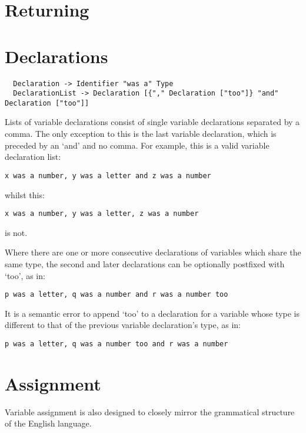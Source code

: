 \documentclass[a4wide, 11pt]{article}
\begin{document}
\section {Returning}

\section{Declarations}

\begin{verbatim}
  Declaration -> Identifier "was a" Type
  DeclarationList -> Declaration [{"," Declaration ["too"]} "and" Declaration ["too"]]
\end{verbatim}

Lists of variable declarations consist of single variable declarations separated by a comma. The only exception to this is the last variable declaration, which is preceded by an `and' and no comma. For example, this is a valid variable declaration list:

\begin{verbatim}
x was a number, y was a letter and z was a number
\end{verbatim}

whilst this:

\begin{verbatim}
x was a number, y was a letter, z was a number
\end{verbatim}

is not.

Where there are one or more consecutive declarations of variables which share the same type, the second and later declarations can be optionally postfixed with `too', as in:

\begin{verbatim}
p was a letter, q was a number and r was a number too
\end{verbatim}

It is a semantic error to append `too' to a declaration for a variable whose type is different to that of the previous variable declaration's type, as in:

\begin{verbatim}
p was a letter, q was a number too and r was a number
\end{verbatim}

\section{Assignment}

Variable assignment is also designed to closely mirror the grammatical structure of the English language.
\end{document}
